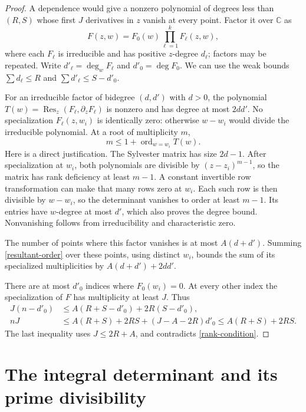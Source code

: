 \documentclass[11pt]{article}
\newcommand{\C}{\mathbb C}
\newcommand{\Res}{\operatorname{Res}}
\newcommand{\ord}{\operatorname{ord}}
\begin{document}
\begin{proof}
A dependence would give a nonzero polynomial of degrees less than
\((R,S)\) whose first \(J\) derivatives in \(z\) vanish at every point.
Factor it over \(\C\) as
\[
 F(z,w)=F_0(w)\prod_{\ell=1}^k F_\ell(z,w),
\]
where each \(F_\ell\) is irreducible and has positive \(z\)-degree
\(d_\ell\); factors may be repeated. Write \(d'_\ell=\deg_w F_\ell\)
and \(d'_0=\deg F_0\). We can use the weak bounds
\(\sum d_\ell\le R\) and \(\sum d'_\ell\le S-d'_0\).

For an irreducible factor of bidegree \((d,d')\) with \(d>0\), the
polynomial \(T(w)=\Res_z(F_\ell,\partial_zF_\ell)\) is nonzero and
has degree at most \(2dd'\). No specialization
\(F_\ell(z,w_i)\) is identically zero: otherwise \(w-w_i\) would
divide the irreducible polynomial. At a root of multiplicity \(m\),
\begin{equation}\label{resultant-order}
 m\le1+\ord_{w=w_i}T(w).
\end{equation}
Here is a direct justification. The Sylvester matrix has size \(2d-1\).
After specialization at \(w_i\), both polynomials are divisible by
\((z-z_i)^{m-1}\), so the matrix has rank deficiency at least \(m-1\).
A constant invertible row transformation can make that many rows zero
at \(w_i\). Each such row is then divisible by \(w-w_i\), so the
determinant vanishes to order at least \(m-1\). Its entries have
\(w\)-degree at most \(d'\), which also proves the degree bound.
Nonvanishing follows from irreducibility and characteristic zero.

The number of points where this factor vanishes is at most
\(A(d+d')\). Summing \eqref{resultant-order} over these points, using
distinct \(w_i\), bounds the sum of its specialized multiplicities by
\(A(d+d')+2dd'\).

There are at most \(d'_0\) indices where \(F_0(w_i)=0\). At every
other index the specialization of \(F\) has multiplicity at least \(J\).
Thus
\begin{align*}
 J(n-d'_0)
 &\le A(R+S-d'_0)+2R(S-d'_0),\\
 nJ
 &\le A(R+S)+2RS+(J-A-2R)d'_0
 \le A(R+S)+2RS.
\end{align*}
The last inequality uses \(J\le2R+A\), and contradicts
\eqref{rank-condition}.
\end{proof}

\section{The integral determinant and its prime divisibility}\label{det}
\end{document}

